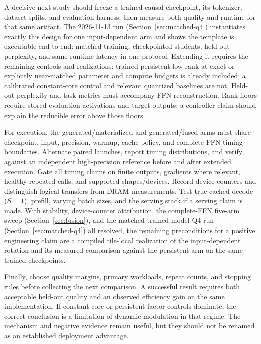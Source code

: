 A decisive next study should freeze a trained causal checkpoint, its tokenizer,
dataset splits, and evaluation harness; then measure both quality and runtime
for that same artifact. The 2026-11-13 run
(Section~\ref{sec:matched-q4}) instantiates exactly this design for one
input-dependent arm and shows the template is executable end to end: matched
training, checkpointed students, held-out perplexity, and same-runtime latency
in one protocol. Extending it requires the remaining controls and realizations:
trained persistent low rank at exact or explicitly near-matched parameter and
compute budgets is already included; a calibrated constant-core control and
relevant quantized baselines are not. Held-out perplexity and task metrics
must accompany FFN reconstruction. Rank floors require stored evaluation
activations and target outputs; a controller claim should explain the
reducible error above those floors.

For execution, the generated/materialized and generated/fused arms must share
checkpoint, input, precision, warmup, cache policy, and complete-FFN timing
boundaries. Alternate paired launches, report timing distributions, and verify
against an independent high-precision reference before and after extended
execution. Gate all timing claims on finite outputs, gradients where relevant,
healthy repeated calls, and supported shapes/devices. Record device counters
and distinguish logical transfers from DRAM measurements. Test true cached
decode ($S=1$), prefill, varying batch sizes, and the serving stack if a serving
claim is made. With stability, device-counter attribution, the
complete-FFN five-arm sweep (Section~\ref{sec:fusion}), and the matched
trained-model Q4 run (Section~\ref{sec:matched-q4}) all resolved, the
remaining preconditions for a positive engineering claim are a compiled
tile-local realization of the input-dependent rotation and its measured
comparison against the persistent arm on the same trained checkpoints.

Finally, choose quality margins, primary workloads, repeat counts, and stopping
rules before collecting the next comparison. A successful result requires both
acceptable held-out quality and an observed efficiency gain on the same
implementation. If constant-core or persistent-factor controls dominate, the
correct conclusion is a limitation of dynamic modulation in that regime.
The mechanism and negative evidence remain useful, but they should not be
renamed as an established deployment advantage.

